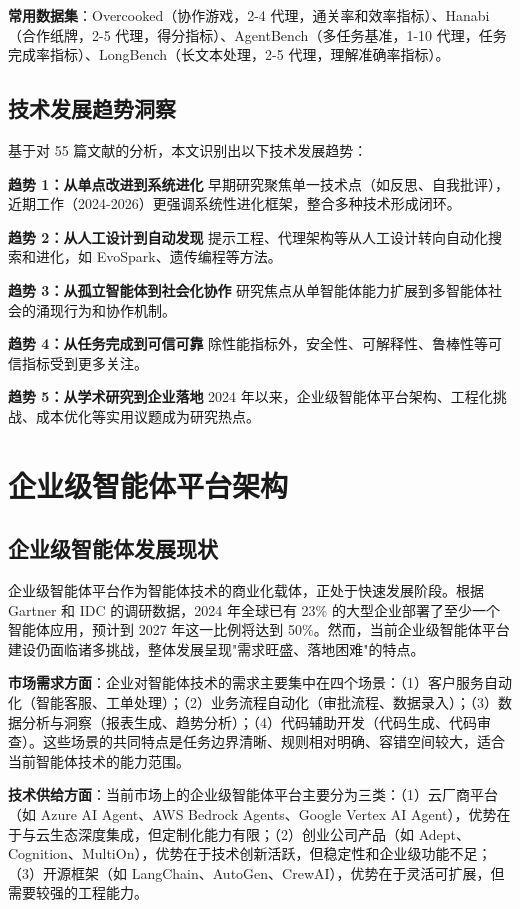 \documentclass[12pt,a4paper]{article}
\begin{document}
\textbf{常用数据集}：Overcooked（协作游戏，2-4 代理，通关率和效率指标）、Hanabi（合作纸牌，2-5 代理，得分指标）、AgentBench（多任务基准，1-10 代理，任务完成率指标）、LongBench（长文本处理，2-5 代理，理解准确率指标）。

\subsection{技术发展趋势洞察}

基于对 55 篇文献的分析，本文识别出以下技术发展趋势：

\textbf{趋势 1：从单点改进到系统进化}
早期研究聚焦单一技术点（如反思、自我批评），近期工作（2024-2026）更强调系统性进化框架，整合多种技术形成闭环。

\textbf{趋势 2：从人工设计到自动发现}
提示工程、代理架构等从人工设计转向自动化搜索和进化，如 EvoSpark、遗传编程等方法。

\textbf{趋势 3：从孤立智能体到社会化协作}
研究焦点从单智能体能力扩展到多智能体社会的涌现行为和协作机制。

\textbf{趋势 4：从任务完成到可信可靠}
除性能指标外，安全性、可解释性、鲁棒性等可信指标受到更多关注。

\textbf{趋势 5：从学术研究到企业落地}
2024 年以来，企业级智能体平台架构、工程化挑战、成本优化等实用议题成为研究热点。

\section{企业级智能体平台架构}
\label{sec:enterprise}

\subsection{企业级智能体发展现状}

企业级智能体平台作为智能体技术的商业化载体，正处于快速发展阶段。根据 Gartner 和 IDC 的调研数据，2024 年全球已有 23\% 的大型企业部署了至少一个智能体应用，预计到 2027 年这一比例将达到 50\%。然而，当前企业级智能体平台建设仍面临诸多挑战，整体发展呈现"需求旺盛、落地困难"的特点。

\textbf{市场需求方面}：企业对智能体技术的需求主要集中在四个场景：（1）客户服务自动化（智能客服、工单处理）；（2）业务流程自动化（审批流程、数据录入）；（3）数据分析与洞察（报表生成、趋势分析）；（4）代码辅助开发（代码生成、代码审查）。这些场景的共同特点是任务边界清晰、规则相对明确、容错空间较大，适合当前智能体技术的能力范围。

\textbf{技术供给方面}：当前市场上的企业级智能体平台主要分为三类：（1）云厂商平台（如 Azure AI Agent、AWS Bedrock Agents、Google Vertex AI Agent），优势在于与云生态深度集成，但定制化能力有限；（2）创业公司产品（如 Adept、Cognition、MultiOn），优势在于技术创新活跃，但稳定性和企业级功能不足；（3）开源框架（如 LangChain、AutoGen、CrewAI），优势在于灵活可扩展，但需要较强的工程能力。
\end{document}
